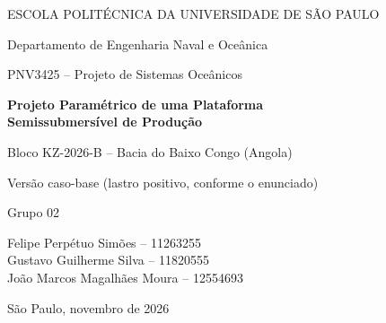 \documentclass[11pt,a4paper]{article}
\newcommand{\integrantes}{Felipe Perpétuo Simões -- 11263255\\[2pt]
  Gustavo Guilherme Silva -- 11820555\\[2pt]
  João Marcos Magalhães Moura -- 12554693}
\newcommand{\Hz}{H_{1/3,z}}
\begin{document}
\begin{titlepage}
\centering
{\large ESCOLA POLITÉCNICA DA UNIVERSIDADE DE SÃO PAULO\par}
{\large Departamento de Engenharia Naval e Oceânica\par}
\vspace{2.5cm}
{\Large PNV3425 -- Projeto de Sistemas Oceânicos\par}
\vspace{1.2cm}
{\LARGE\bfseries Projeto Paramétrico de uma Plataforma\\[4pt] Semissubmersível de Produção\par}
\vspace{0.8cm}
{\Large Bloco KZ-2026-B -- Bacia do Baixo Congo (Angola)\par}
\vspace{0.4cm}
{\large Versão caso-base (lastro positivo, conforme o enunciado)\par}
\vspace{2.5cm}
{\large Grupo 02\par}
\vspace{0.4cm}
{\normalsize \integrantes\par}
\vfill
{\large São Paulo, novembro de 2026\par}
\end{titlepage}

\begin{abstract}
Este relatório apresenta o projeto paramétrico de uma plataforma semissubmersível de produção
para o bloco KZ-2026-B, em lâmina d'água de 1.450~m na bacia do Baixo Congo. A plataforma tem
dois \emph{pontoons} retangulares e quatro colunas quadradas em planta quadrada de lado $L_p$.
Um modelo em Python calcula, para cada conjunto de variáveis $(L_p, b_p, h_p, b_c, h_c, T)$, a
hidrostática, os pesos e centros, a curva GZ pelo método de projeções 2D, o critério de áreas
para o momento de vento (DNV-OS-C301 / Código MODU 2009), a resposta em \emph{heave} no mar de
100 anos ($H_s = 5{,}6$~m, $T_p = 15{,}2$~s) e o \emph{air gap} mínimo. O modelo foi validado
contra os resultados das aulas na plataforma dos Exercícios 7 a 10, com erros de 0,0\% em
$T_n$, 0,1\% em $\Hz$, 0,6\% no KG e de 0,9\% a 3,7\% no $A/B$. A otimização combina 20.000
amostras de hipercubo latino, soma ponderada e método $\varepsilon$-restrito com SLSQP e um
filtro de não dominância, e produz uma fronteira de Pareto de 25 pontos entre 10.346~t
($\Hz = 2{,}37$~m) e 23.634~t ($\Hz = 1{,}04$~m). A solução escolhida, no joelho da
fronteira, tem $L_p = 111{,}8$~m, $T = 24{,}0$~m, peso estrutural do casco de 14.998~t,
$\Hz = 1{,}55$~m, $T_n = 21{,}8$~s e $A/B = 1{,}303$. Em todas as soluções ótimas o projeto é
governado pela estabilidade: o $GM_T$ fica no limite de 4~m e o $A/B$ no limite de 1,30.
\end{abstract}
\end{document}
